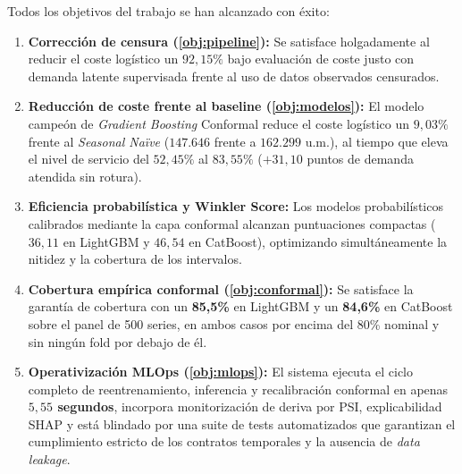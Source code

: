 Todos los objetivos del trabajo se han alcanzado con éxito:
\begin{enumerate}
    \item \textbf{Corrección de censura (\ref{obj:pipeline}):} Se satisface holgadamente al reducir el coste logístico un \textbf{$92{,}15\%$} bajo evaluación de coste justo con demanda latente supervisada frente al uso de datos observados censurados.
    \item \textbf{Reducción de coste frente al baseline (\ref{obj:modelos}):} El modelo campeón de \textit{Gradient Boosting} Conformal reduce el coste logístico un \textbf{$9{,}03\%$} frente al \textit{Seasonal Naïve} ($147.646$ frente a $162.299$ u.m.), al tiempo que eleva el nivel de servicio del $52{,}45\%$ al $83{,}55\%$ ($+31{,}10$ puntos de demanda atendida sin rotura).
    \item \textbf{Eficiencia probabilística y Winkler Score:} Los modelos probabilísticos calibrados mediante la capa conformal alcanzan puntuaciones compactas ($36{,}11$ en LightGBM y $46{,}54$ en CatBoost), optimizando simultáneamente la nitidez y la cobertura de los intervalos.
    \item \textbf{Cobertura empírica conformal (\ref{obj:conformal}):} Se satisface la garantía de cobertura con un \textbf{85{,}5\%} en LightGBM y un \textbf{84{,}6\%} en CatBoost sobre el panel de 500 series, en ambos casos por encima del 80\% nominal y sin ningún fold por debajo de él.
    \item \textbf{Operativización MLOps (\ref{obj:mlops}):} El sistema ejecuta el ciclo completo de reentrenamiento, inferencia y recalibración conformal en apenas \textbf{$5{,}55$ segundos}, incorpora monitorización de deriva por PSI, explicabilidad SHAP y está blindado por una suite de tests automatizados que garantizan el cumplimiento estricto de los contratos temporales y la ausencia de \textit{data leakage}.
\end{enumerate}
